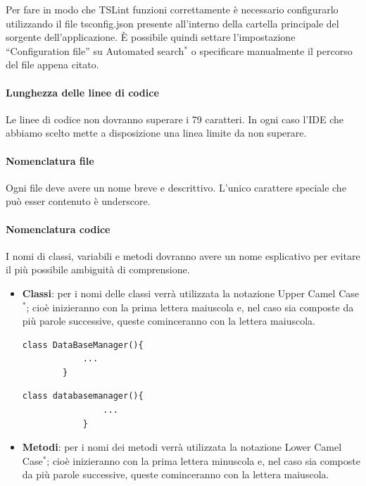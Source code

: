 \documentclass[11pt,a4paper]{article}
\begin{document}
{	Per fare in modo che TSLint funzioni correttamente è necessario configurarlo utilizzando il file tsconfig.json presente all'interno della cartella principale del sorgente dell'applicazione. È possibile quindi settare l'impostazione ``Configuration file'' su Automated search$^*$ o specificare manualmente il percorso del file appena citato.
	
	\paragraph{Lunghezza delle linee di codice} Le linee di codice non dovranno superare i 79 caratteri. In ogni caso l'IDE che abbiamo scelto mette a disposizione una linea limite da non superare.
	\paragraph{Nomenclatura file} 
	Ogni file deve avere un nome breve e descrittivo. L'unico carattere speciale che può esser contenuto è underscore.
	\paragraph{Nomenclatura codice}
	I nomi di classi, variabili e metodi dovranno avere un nome esplicativo per evitare il più possibile ambiguità di comprensione.
	\begin{itemize}
		\item \textbf{Classi}: per i nomi delle classi verrà utilizzata la notazione Upper Camel Case$^*$; cioè inizieranno con la prima lettera maiuscola e, nel caso sia composte da più parole successive, queste cominceranno con la lettera maiuscola.
	
		\begin{multicols}{2}
			
			\begin{lstlisting}[caption=nome classe corretto]
		class DataBaseManager(){
			...
		}
			\end{lstlisting}
			
			\begin{lstlisting}[caption=nome classe scorretto]
			class databasemanager(){
				...
			}
			\end{lstlisting}
		\end{multicols}
		
		
		\item \textbf{Metodi}: per i nomi dei metodi verrà utilizzata la notazione Lower Camel Case$^*$; cioè inizieranno con la prima lettera minuscola e, nel caso sia composte da più parole successive, queste cominceranno con la lettera maiuscola.
	


\end{itemize}}
\end{document}

